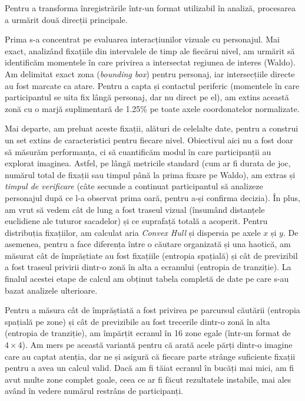 Pentru a transforma înregistrările într-un format utilizabil în analiză, procesarea a urmărit două direcții principale.

Prima s-a concentrat pe evaluarea interacțiunilor vizuale cu personajul. Mai exact, analizând fixațiile din intervalele de timp ale fiecărui nivel, am urmărit să identificăm momentele în care privirea a intersectat regiunea de interes (Waldo). Am delimitat exact zona (\emph{bounding box}) pentru personaj, iar intersecțiile directe au fost marcate ca atare. Pentru a capta și contactul periferic (momentele în care participantul se uita fix lângă personaj, dar nu direct pe el), am extins această zonă cu o marjă suplimentară de 1.25\% pe toate axele coordonatelor normalizate.

Mai departe, am preluat aceste fixații, alături de celelalte date, pentru a construi un set extins de caracteristici pentru fiecare nivel. Obiectivul aici nu a fost doar să măsurăm performanța, ci să cuantificăm modul în care participanții au explorat imaginea. Astfel, pe lângă metricile standard (cum ar fi durata de joc, numărul total de fixații sau timpul până la prima fixare pe Waldo), am extras și \emph{timpul de verificare} (câte secunde a continuat participantul să analizeze personajul după ce l-a observat prima oară, pentru a-și confirma decizia). În plus, am vrut să vedem cât de lung a fost traseul vizual (însumând distanțele euclidiene ale tuturor sacadelor) și ce suprafață totală a acoperit. Pentru distribuția fixațiilor, am calculat aria \emph{Convex Hull} și dispersia pe axele $x$ și $y$. De asemenea, pentru a face diferența între o căutare organizată și una haotică, am măsurat cât de împrăștiate au fost fixațiile (entropia spațială) și cât de previzibil a fost traseul privirii dintr-o zonă în alta a ecranului (entropia de tranziție). La finalul acestei etape de calcul am obținut tabela completă de date pe care s-au bazat analizele ulterioare.

Pentru a măsura cât de împrăștiată a fost privirea pe parcursul căutării (entropia spațială pe zone) și cât de previzibile au fost trecerile dintr-o zonă în alta (entropia de tranziție), am împărțit ecranul în 16 zone egale (într-un format de $4 \times 4$). Am mers pe această variantă pentru că arată acele părți dintr-o imagine care au captat atenția, dar ne și asigură că fiecare parte strânge suficiente fixații pentru a avea un calcul valid. Dacă am fi tăiat ecranul în bucăți mai mici, am fi avut multe zone complet goale, ceea ce ar fi făcut rezultatele instabile, mai ales având în vedere numărul restrâns de participanți. 

